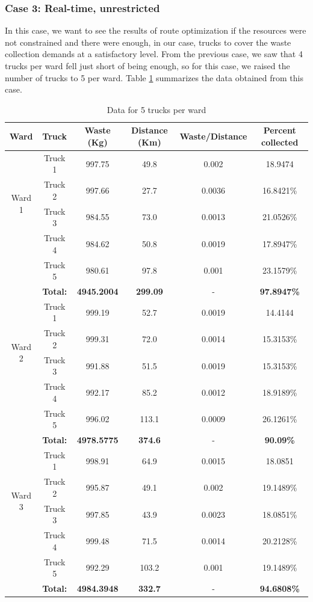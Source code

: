 \documentclass[12pt]{article}
\begin{document}
\subsubsection*{Case 3: Real-time, unrestricted}

In this case, we want to see the results of route optimization if the resources were not constrained and there were enough, in our case, trucks to cover the waste collection demands at a satisfactory level. From the previous case, we saw that 4 trucks per ward fell just short of being enough, so for this case, we raised the number of trucks to 5 per ward. Table \ref{tab3} summarizes the data obtained from this case.

\begin{table}[H]
    \centering
    \caption{ Data for 5 trucks per ward} \label{tab3}
    \vspace*{0.3cm}
    \begin{tabular}{|c|c|c|c|c|c|}
        \hline Ward & Truck & Waste (Kg) & Distance (Km) & Waste/Distance & Percent collected \\
        \hline \multirow{4}{*}{Ward 1} & Truck 1 &997.75  &49.8  &0.002  &18.9474 \\
        \cline{2-6}& Truck 2 &997.66&27.7&0.0036&16.8421\%\\        
        \cline{2-6}& Truck 3 &984.55&73.0&0.0013&21.0526\%\\        
        \cline{2-6}& Truck 4 &984.62&50.8&0.0019&17.8947\%\\
        \cline{2-6}& Truck 5 &980.61&97.8&0.001&23.1579\%\\
        \hline &\textbf{Total:} &\textbf{4945.2004} &\textbf{299.09} &- &\textbf{97.8947\%}\\
        \hline \multirow{4}{*}{Ward 2} & Truck 1 &999.19  &52.7  &0.0019  &14.4144 \\
        \cline{2-6}& Truck 2 &999.31&72.0&0.0014&15.3153\%\\        
        \cline{2-6}& Truck 3 &991.88&51.5&0.0019&15.3153\%\\        
        \cline{2-6}& Truck 4 &992.17&85.2&0.0012&18.9189\%\\      
        \cline{2-6}& Truck 5 &996.02&113.1&0.0009&26.1261\%\\
        \hline &\textbf{Total:} &\textbf{4978.5775} &\textbf{374.6} &- &\textbf{90.09\%}\\     
        \hline \multirow{4}{*}{Ward 3} & Truck 1 &998.91  &64.9  &0.0015  &18.0851 \\
        \cline{2-6}& Truck 2 &995.87&49.1&0.002&19.1489\%\\        
        \cline{2-6}& Truck 3 &997.85&43.9&0.0023&18.0851\%\\        
        \cline{2-6}& Truck 4 &999.48&71.5&0.0014&20.2128\%\\
        \cline{2-6}& Truck 5 &992.29&103.2&0.001&19.1489\%\\
        \hline &\textbf{Total:} &\textbf{4984.3948} &\textbf{332.7}&- &\textbf{94.6808\%}\\
        \hline      
    \end{tabular}
\end{table}
\end{document}

